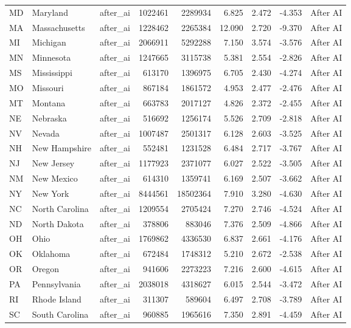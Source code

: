 \begin{tabular}{lllrrrrrl}
MD & Maryland & after\_ai & 1022461 & 2289934 & 6.825 & 2.472 & -4.353 & After AI \\
MA & Massachusetts & after\_ai & 1228462 & 2265384 & 12.090 & 2.720 & -9.370 & After AI \\
MI & Michigan & after\_ai & 2066911 & 5292288 & 7.150 & 3.574 & -3.576 & After AI \\
MN & Minnesota & after\_ai & 1247665 & 3115738 & 5.381 & 2.554 & -2.826 & After AI \\
MS & Mississippi & after\_ai & 613170 & 1396975 & 6.705 & 2.430 & -4.274 & After AI \\
MO & Missouri & after\_ai & 867184 & 1861572 & 4.953 & 2.477 & -2.476 & After AI \\
MT & Montana & after\_ai & 663783 & 2017127 & 4.826 & 2.372 & -2.455 & After AI \\
NE & Nebraska & after\_ai & 516692 & 1256174 & 5.526 & 2.709 & -2.818 & After AI \\
NV & Nevada & after\_ai & 1007487 & 2501317 & 6.128 & 2.603 & -3.525 & After AI \\
NH & New Hampshire & after\_ai & 552481 & 1231528 & 6.484 & 2.717 & -3.767 & After AI \\
NJ & New Jersey & after\_ai & 1177923 & 2371077 & 6.027 & 2.522 & -3.505 & After AI \\
NM & New Mexico & after\_ai & 614310 & 1359741 & 6.169 & 2.507 & -3.662 & After AI \\
NY & New York & after\_ai & 8444561 & 18502364 & 7.910 & 3.280 & -4.630 & After AI \\
NC & North Carolina & after\_ai & 1209554 & 2705424 & 7.270 & 2.746 & -4.524 & After AI \\
ND & North Dakota & after\_ai & 378806 & 883046 & 7.376 & 2.509 & -4.866 & After AI \\
OH & Ohio & after\_ai & 1769862 & 4336530 & 6.837 & 2.661 & -4.176 & After AI \\
OK & Oklahoma & after\_ai & 672484 & 1748312 & 5.210 & 2.672 & -2.538 & After AI \\
OR & Oregon & after\_ai & 941606 & 2273223 & 7.216 & 2.600 & -4.615 & After AI \\
PA & Pennsylvania & after\_ai & 2038018 & 4318627 & 6.015 & 2.544 & -3.472 & After AI \\
RI & Rhode Island & after\_ai & 311307 & 589604 & 6.497 & 2.708 & -3.789 & After AI \\
SC & South Carolina & after\_ai & 960885 & 1965616 & 7.350 & 2.891 & -4.459 & After AI \\

\end{tabular}

